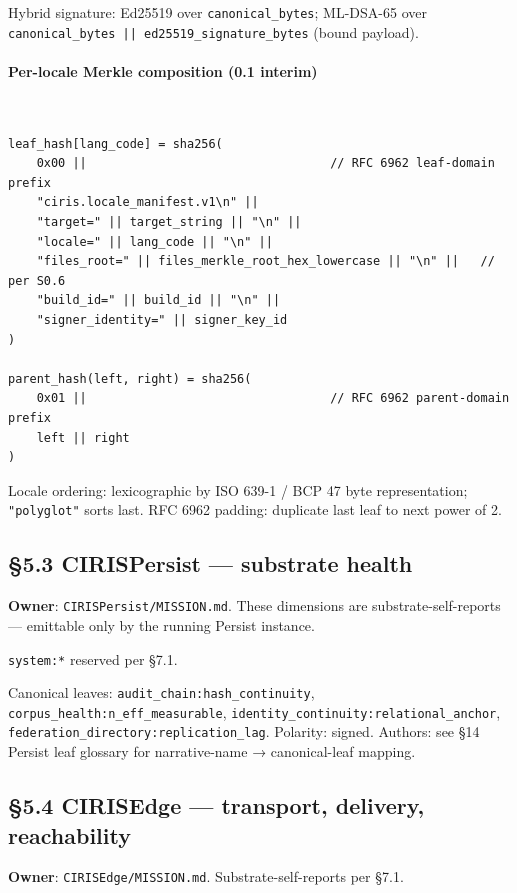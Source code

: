 \documentclass[11pt]{article}
\begin{document}
Hybrid signature: Ed25519 over \texttt{canonical\_bytes}; ML-DSA-65 over \texttt{canonical\_bytes || ed25519\_signature\_bytes} (bound payload).


\paragraph{Per-locale Merkle composition (0.1 interim)}\mbox{}\\


\begin{lstlisting}
leaf_hash[lang_code] = sha256(
    0x00 ||                                  // RFC 6962 leaf-domain prefix
    "ciris.locale_manifest.v1\n" ||
    "target=" || target_string || "\n" ||
    "locale=" || lang_code || "\n" ||
    "files_root=" || files_merkle_root_hex_lowercase || "\n" ||   // per S0.6
    "build_id=" || build_id || "\n" ||
    "signer_identity=" || signer_key_id
)

parent_hash(left, right) = sha256(
    0x01 ||                                  // RFC 6962 parent-domain prefix
    left || right
)
\end{lstlisting}

Locale ordering: lexicographic by ISO 639-1 / BCP 47 byte representation; \texttt{"polyglot"} sorts last. RFC 6962 padding: duplicate last leaf to next power of 2.


\subsection*{§5.3 CIRISPersist — substrate health}


\textbf{Owner}: \texttt{CIRISPersist/MISSION.md}. These dimensions are substrate-self-reports — emittable only by the running Persist instance.


\texttt{system:*} reserved per §7.1.


Canonical leaves: \texttt{audit\_chain:hash\_continuity}, \texttt{corpus\_health:n\_eff\_measurable}, \texttt{identity\_continuity:relational\_anchor}, \texttt{federation\_directory:replication\_lag}. Polarity: signed. Authors: see §14 Persist leaf glossary for narrative-name → canonical-leaf mapping.


\subsection*{§5.4 CIRISEdge — transport, delivery, reachability}


\textbf{Owner}: \texttt{CIRISEdge/MISSION.md}. Substrate-self-reports per §7.1.
\end{document}
